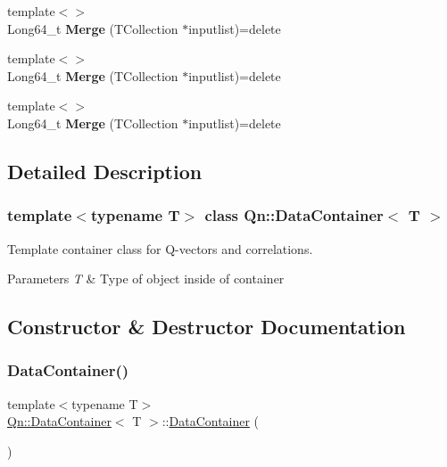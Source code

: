 \begin{DoxyCompactItemize}
{\footnotesize template$<$$>$ }\\Long64\+\_\+t {\bfseries Merge} (T\+Collection $\ast$inputlist)=delete
\item 
\mbox{\label{classQn_1_1DataContainer_a2fe2338539953479112cd96155b3bbd8}} 
{\footnotesize template$<$$>$ }\\Long64\+\_\+t {\bfseries Merge} (T\+Collection $\ast$inputlist)=delete
\item 
\mbox{\label{classQn_1_1DataContainer_acce1b182d0c927793f12625b17a9666b}} 
{\footnotesize template$<$$>$ }\\Long64\+\_\+t {\bfseries Merge} (T\+Collection $\ast$inputlist)=delete
\end{DoxyCompactItemize}


\subsection{Detailed Description}
\subsubsection*{template$<$typename T$>$\newline
class Qn\+::\+Data\+Container$<$ T $>$}

Template container class for Q-\/vectors and correlations. 


\begin{DoxyParams}{Parameters}
{\em T} & Type of object inside of container \\
\hline
\end{DoxyParams}


\subsection{Constructor \& Destructor Documentation}
\mbox{\label{classQn_1_1DataContainer_a5443239806a27f42e502c88d6f76328e}} 
\subsubsection{\texorpdfstring{Data\+Container()}{DataContainer()}\hspace{0.1cm}{\footnotesize\ttfamily [1/2]}}
{\footnotesize\ttfamily template$<$typename T$>$ \\
\mbox{\hyperlink{classQn_1_1DataContainer}{Qn\+::\+Data\+Container}}$<$ T $>$\+::\mbox{\hyperlink{classQn_1_1DataContainer}{Data\+Container}} (\begin{DoxyParamCaption}{ }\end{DoxyParamCaption})\hspace{0.3cm}{\ttfamily [inline]}}

